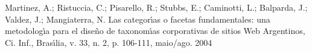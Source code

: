 \documentclass[
12pt,		%
openright,	%
twoside,  %
a4paper,			%
chapter=TITLE,		%
english,			%
french,				%
spanish,			%
brazil				%
]{USPSC-classe/USPSC}
\begin{document}
\begin{flushleft}
\begin{flushleft}
\begin{flushleft}
\begin{flushleft}
\begin{flushleft}
\begin{flushleft}
\begin{flushleft}
\begin{flushleft}
\begin{flushleft}
\begin{flushleft}
[MARTINEZ et al., 2004] Martinez, A.; Ristuccia, C.; Pisarello, R.; Stubbs, E.; Caminotti, L.; Balparda, J.; Valdez, J.; Mangiaterra, N. Las categor\'{\i}as o facetas fundamentales: una metodolog\'{\i}a para el diseño de taxonom\'{\i}as corporativas de sitios Web Argentinos, Ci. Inf., Bras\'{\i}lia, v. 33, n. 2, p. 106-111, maio/ago. 2004
\end{flushleft}


\end{flushleft}


\end{flushleft}


\end{flushleft}


\end{flushleft}


\end{flushleft}


\end{flushleft}


\end{flushleft}


\end{flushleft}


\end{flushleft}
\end{document}
